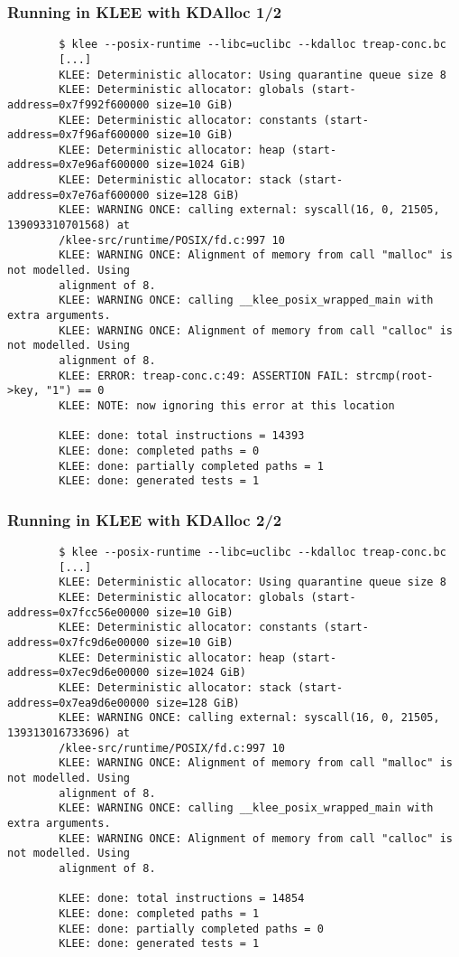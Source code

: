 \documentclass{beamer}
\begin{document}
\begin{frame}[fragile]
	\frametitle{Running in KLEE with KDAlloc 1/2}
	\begin{verbatim}
		$ klee --posix-runtime --libc=uclibc --kdalloc treap-conc.bc
		[...]
		KLEE: Deterministic allocator: Using quarantine queue size 8
		KLEE: Deterministic allocator: globals (start-address=0x7f992f600000 size=10 GiB)
		KLEE: Deterministic allocator: constants (start-address=0x7f96af600000 size=10 GiB)
		KLEE: Deterministic allocator: heap (start-address=0x7e96af600000 size=1024 GiB)
		KLEE: Deterministic allocator: stack (start-address=0x7e76af600000 size=128 GiB)
		KLEE: WARNING ONCE: calling external: syscall(16, 0, 21505, 139093310701568) at
		/klee-src/runtime/POSIX/fd.c:997 10
		KLEE: WARNING ONCE: Alignment of memory from call "malloc" is not modelled. Using
		alignment of 8.
		KLEE: WARNING ONCE: calling __klee_posix_wrapped_main with extra arguments.
		KLEE: WARNING ONCE: Alignment of memory from call "calloc" is not modelled. Using
		alignment of 8.
		KLEE: ERROR: treap-conc.c:49: ASSERTION FAIL: strcmp(root->key, "1") == 0
		KLEE: NOTE: now ignoring this error at this location

		KLEE: done: total instructions = 14393
		KLEE: done: completed paths = 0
		KLEE: done: partially completed paths = 1
		KLEE: done: generated tests = 1
	\end{verbatim}
\end{frame}

\begin{frame}[fragile]
	\frametitle{Running in KLEE with KDAlloc 2/2}
	\begin{verbatim}
		$ klee --posix-runtime --libc=uclibc --kdalloc treap-conc.bc
		[...]
		KLEE: Deterministic allocator: Using quarantine queue size 8
		KLEE: Deterministic allocator: globals (start-address=0x7fcc56e00000 size=10 GiB)
		KLEE: Deterministic allocator: constants (start-address=0x7fc9d6e00000 size=10 GiB)
		KLEE: Deterministic allocator: heap (start-address=0x7ec9d6e00000 size=1024 GiB)
		KLEE: Deterministic allocator: stack (start-address=0x7ea9d6e00000 size=128 GiB)
		KLEE: WARNING ONCE: calling external: syscall(16, 0, 21505, 139313016733696) at
		/klee-src/runtime/POSIX/fd.c:997 10
		KLEE: WARNING ONCE: Alignment of memory from call "malloc" is not modelled. Using
		alignment of 8.
		KLEE: WARNING ONCE: calling __klee_posix_wrapped_main with extra arguments.
		KLEE: WARNING ONCE: Alignment of memory from call "calloc" is not modelled. Using
		alignment of 8.

		KLEE: done: total instructions = 14854
		KLEE: done: completed paths = 1
		KLEE: done: partially completed paths = 0
		KLEE: done: generated tests = 1
	\end{verbatim}
\end{frame}
\end{document}
